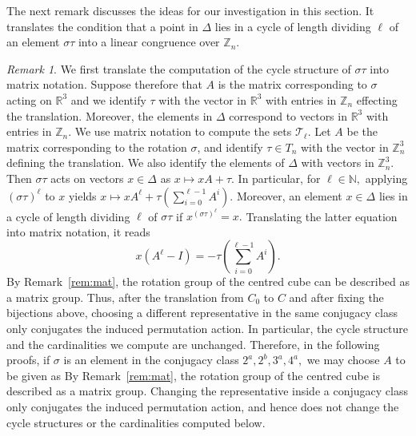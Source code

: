 \documentclass[12pt]{article}
\theoremstyle{definition}
\theoremstyle{remark}
\newtheorem{remark}[theorem]{Remark}
\newcommand{\Z}{{\mathbb{Z}}}
\newcommand{\N}{{\mathbb{N}}}
\newcommand{\R}{{\mathbb{R}}}
\begin{document}
The next remark discusses the ideas for our investigation in this section.
It translates the condition that a point in $\Delta$ lies in a cycle of length dividing $\ell$ of an element $\sigma\tau$ into a linear congruence over $\mathbb Z_n$.
\begin{remark}\label{rem:A}
{\color{red}We first translate the computation of
the cycle structure of $\sigma\tau$ into matrix notation. Suppose therefore that $A$ is the matrix corresponding to $\sigma$ acting on $\R^3$ and we identify $\tau$ with the vector in $\R^3$ with entries in $\Z_n$ effecting the translation. Moreover, the elements in $\Delta$
correspond to vectors in $\R^3$ with entries in $\Z_n$.}
{\color{blue}We use matrix notation to compute the sets $\mathcal T_\ell$.
Let $A$ be the matrix corresponding to the rotation $\sigma$, and identify $\tau\in T_n$ with the vector in $\mathbb Z_n^3$ defining the translation.
We also identify the elements of $\Delta$ with vectors in $\mathbb Z_n^3$.}
Then $\sigma\tau$ acts on vectors $x\in \Delta$
as
$x\mapsto xA + \tau.$ In particular, for $\ell \in \N,$
applying $(\sigma\tau)^\ell$ to $x$
yields
$x\mapsto xA^\ell + \tau(\sum_{i=0}^{\ell-1} A^i).$
Moreover, an element $x\in \Delta$  lies in a cycle of length dividing $\ell$ of $\sigma\tau$ if
$x^{(\sigma\tau)^\ell} = x.$
Translating the latter equation into matrix notation, it reads
\begin{equation}\label{eq:lcyc}
x\left( A^\ell- I\right) = -\tau \left(\sum_{i=0}^{\ell-1}A^i\right).
\end{equation}
{\color{red}By Remark~\ref{rem:mat}, the rotation group of the centred cube can be described as a matrix group. Thus, after the translation from $C_0$ to $C$ and after fixing the bijections above, choosing a different representative in the same conjugacy class only conjugates the induced permutation action. In particular, the cycle structure and the cardinalities we compute are unchanged. Therefore, in the following proofs, if $\sigma$ is an element in the conjugacy class $2^a,2^b,3^a,4^a,$ we may choose $A$ to be given as}
{\color{blue}By Remark~\ref{rem:mat}, the rotation group of the centred cube is described as a matrix group.
Changing the representative inside a conjugacy class only conjugates the induced permutation action, and hence does not change the cycle structures or the cardinalities computed below.
}
\end{remark}
\end{document}

